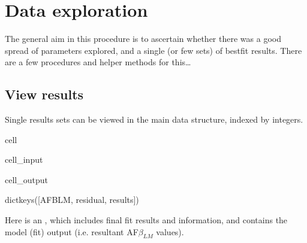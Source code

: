 \documentclass[letterpaper,table,10pt,english]{jupyterBook}
\begin{document}
\section{Data exploration}
\label{\detokenize{part2/case-study-N2_290723:data-exploration}}
\sphinxAtStartPar
The general aim in this procedure is to ascertain whether there was a good spread of parameters explored, and a single (or few sets) of best\sphinxhyphen{}fit results. There are a few procedures and helper methods for this…


\subsection{View results}
\label{\detokenize{part2/case-study-N2_290723:view-results}}
\sphinxAtStartPar
Single results sets can be viewed in the main data structure, indexed by integers.

\begin{sphinxuseclass}{cell}\begin{sphinxVerbatimInput}

\begin{sphinxuseclass}{cell_input}
\begin{sphinxVerbatim}[commandchars=\\\{\}]
  
\PYG{p}{[}\PYG{p}{]}
\end{sphinxVerbatim}

\end{sphinxuseclass}\end{sphinxVerbatimInput}
\begin{sphinxVerbatimOutput}

\begin{sphinxuseclass}{cell_output}
\begin{sphinxVerbatim}[commandchars=\\\{\}]
dict\PYGZus{}keys([\PYGZsq{}AFBLM\PYGZsq{}, \PYGZsq{}residual\PYGZsq{}, \PYGZsq{}results\PYGZsq{}])
\end{sphinxVerbatim}

\end{sphinxuseclass}\end{sphinxVerbatimOutput}

\end{sphinxuseclass}
\sphinxAtStartPar
Here  is an , which includes final fit results and information, and  contains the model (fit) output (i.e. resultant AF\sphinxhyphen{}\(\beta_{LM}\) values).
\end{document}
